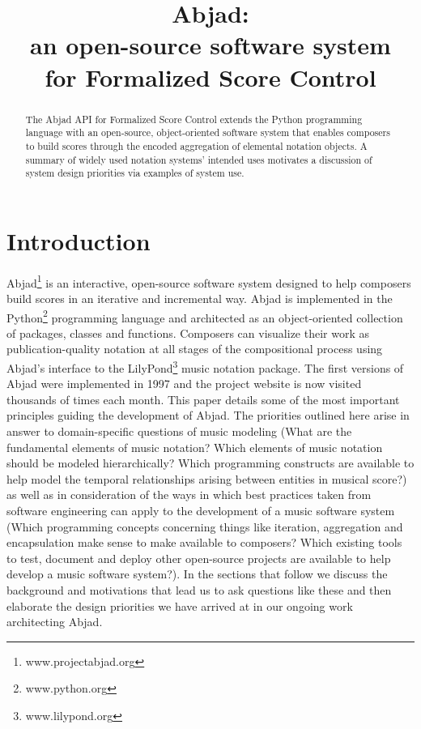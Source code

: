 \documentclass{article}
\title{Abjad: \\
an open-source software system \\
for Formalized Score Control}
\begin{document}
\capstartfalse
\maketitle
\capstarttrue

\begin{abstract}
The Abjad API for Formalized Score Control extends the Python programming
language with an open-source, object-oriented software system that enables
composers to build scores through the encoded aggregation of elemental notation
objects. A summary of widely used notation systems' intended uses motivates a
discussion of system design priorities via examples of system use.
\end{abstract}

\section{Introduction} \label{sec:introduction}

Abjad\footnote{www.projectabjad.org} is an interactive, open-source software
system designed to help composers build scores in an iterative and incremental
way.  Abjad is implemented in the Python\footnote{www.python.org} programming
language and architected as an object-oriented collection of packages, classes
and functions. Composers can visualize their work as publication-quality
notation at all stages of the compositional process using Abjad's interface to
the LilyPond\footnote{www.lilypond.org} music notation package. The first
versions of Abjad were implemented in 1997 and the project website is now
visited thousands of times each month. This paper details some of the most
important principles guiding the development of Abjad. The priorities outlined
here arise in answer to domain-specific questions of music modeling (What are
the fundamental elements of music notation? Which elements of music notation
should be modeled hierarchically? Which programming constructs are available to
help model the temporal relationships arising between entities in musical
score?) as well as in consideration of the ways in which best practices taken
from software engineering can apply to the development of a music software
system (Which programming concepts concerning things like iteration,
aggregation and encapsulation make sense to make available to composers? Which
existing tools to test, document and deploy other open-source projects are
available to help develop a music software system?). In the sections that
follow we discuss the background and motivations that lead us to ask questions
like these and then elaborate the design priorities we have arrived at in our
ongoing work architecting Abjad.
\end{document}
